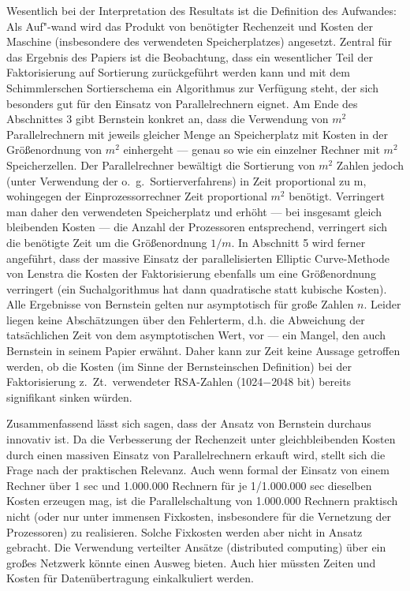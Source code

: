 \begin{refsegment}
Wesentlich bei der Interpretation des Resultats ist die Definition des
Aufwandes: Als Auf"-wand wird das Produkt von benötigter Rechenzeit und
Kosten der Maschine (insbesondere des verwendeten Speicherplatzes)
angesetzt. Zentral für das Ergebnis des Papiers ist die Beobachtung, dass
ein wesentlicher Teil der Faktorisierung auf Sortierung zurückgeführt
werden kann und mit dem Schimmlerschen Sortierschema ein Algorithmus zur
Verfügung steht, der sich besonders gut für den Einsatz von
Parallelrechnern eignet. Am Ende des Abschnittes 3 gibt Bernstein konkret
an, dass die Verwendung von $m^2$ Parallelrechnern mit jeweils gleicher
Menge an Speicherplatz mit Kosten in der Größenordnung von $m^2$
einhergeht --- genau so wie ein einzelner Rechner mit $m^2$ Speicherzellen.
Der Parallelrechner bewältigt die Sortierung von $m^2$ Zahlen jedoch
(unter Verwendung der o.~g.\ Sortierverfahrens) in Zeit proportional zu m,
wohingegen der Einprozessorrechner Zeit proportional $m^2$ benötigt.
Verringert man daher den verwendeten Speicherplatz und erhöht --- bei
insgesamt gleich bleibenden Kosten --- die Anzahl der Prozessoren
entsprechend, verringert sich die benötigte Zeit um die Größenordnung
$1/m$. In Abschnitt 5 wird ferner angeführt, dass der massive Einsatz der
parallelisierten Elliptic Curve-Methode von Lenstra die Kosten der
Faktorisierung ebenfalls um eine Größenordnung verringert (ein
Suchalgorithmus hat dann quadratische statt kubische Kosten).  Alle
Ergebnisse von Bernstein gelten nur asymptotisch für große Zahlen $n$.
Leider liegen keine Abschätzungen über den Fehlerterm, d.h.  die
Abweichung der tatsächlichen Zeit von dem asymptotischen Wert, vor --- ein
Mangel, den auch Bernstein in seinem Papier erwähnt. Daher kann zur Zeit
keine Aussage getroffen werden, ob die Kosten (im Sinne der Bernsteinschen
Definition) bei der Faktorisierung z.~Zt.\ verwendeter RSA-Zahlen
(1024$-$2048 bit) bereits signifikant sinken würden.

Zusammenfassend lässt sich sagen, dass der Ansatz von Bernstein durchaus
innovativ ist. Da die Verbesserung der
Rechenzeit unter gleichbleibenden Kosten durch einen massiven Einsatz von
Parallelrechnern erkauft wird, stellt sich die
Frage nach der praktischen Relevanz. Auch wenn formal der Einsatz von einem
Rechner über 1 sec  und  1.000.000 Rechnern
für je 1/1.000.000 sec dieselben Kosten erzeugen mag, ist die
Parallelschaltung von 1.000.000 Rechnern praktisch nicht
(oder nur unter immensen Fixkosten, insbesondere für die Vernetzung der
Prozessoren) zu realisieren. Solche Fixkosten
werden aber nicht in Ansatz gebracht.
Die Verwendung verteilter Ansätze (distributed computing) über ein
großes Netzwerk könnte einen Ausweg bieten. Auch hier müssten
Zeiten und Kosten für Datenübertragung einkalkuliert werden.


\end{refsegment}
